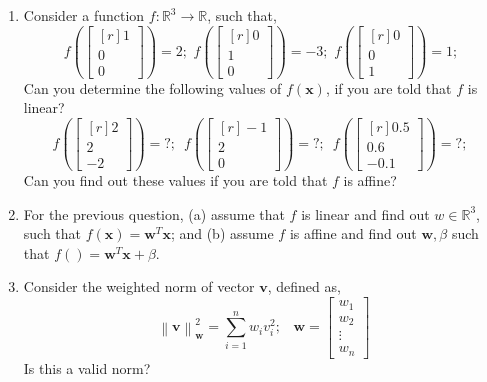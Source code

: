 \begin{enumerate}
    \item Consider a function $f: \mathbb{R}^3 \rightarrow \mathbb{R}$, such that,
    \[ f\left(\begin{bmatrix*}[r]1\\0\\0\end{bmatrix*}\right) = 2; \,\,
    f\left(\begin{bmatrix*}[r]0\\1\\0\end{bmatrix*}\right) = -3; \,\,
    f\left(\begin{bmatrix*}[r]0\\0\\1\end{bmatrix*}\right) = 1; \,\,\]
    Can you determine the following values of $f\left(\mathbf{x}\right)$, if you are told that $f$ is linear?
    \[ f\left(\begin{bmatrix*}[r]2\\2\\-2\end{bmatrix*}\right) = ?; \,\,\,
     f\left(\begin{bmatrix*}[r]-1\\2\\0\end{bmatrix*}\right) = ?; \,\,\,
     f\left(\begin{bmatrix*}[r]0.5\\0.6\\-0.1\end{bmatrix*}\right) = ?; \,\,\,\]
     Can you find out these values if you are told that $f$ is affine?
    
    \item For the previous question, (a) assume that $f$ is linear and find out $w \in \mathbb{R}^3$, such that $f\left(\mathbf{x}\right) = \mathbf{w}^T\mathbf{x}$; and (b) assume $f$ is affine and find out $\mathbf{w}, \beta$ such that $f\left(\right) = \mathbf{w}^T\mathbf{x} + \beta$.

    \item Consider the weighted norm of vector $\mathbf{v}$, defined as,
    \[ \left\lVert \mathbf{v}\right\rVert_{\mathbf{w}}^2 = \sum_{i=1}^{n}w_iv_i^2; \,\,\,\,\, \mathbf{w}=\begin{bmatrix*}w_1\\w_2\\\vdots\\w_n\end{bmatrix*} \]
    Is this a valid norm?\\


\end{enumerate}

